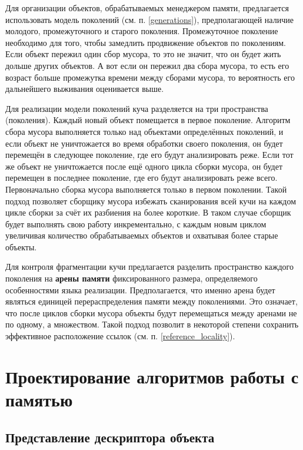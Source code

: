 Для организации объектов, обрабатываемых менеджером памяти, предлагается использовать модель поколений (см. п. \ref{generations}), предполагающей наличие молодого, промежуточного и старого поколения. Промежуточное поколение необходимо для того, чтобы замедлить продвижение объектов по поколениям. Если объект пережил один сбор мусора, то это не значит, что он будет жить дольше других объектов. А вот если он пережил два сбора мусора, то есть его возраст больше промежутка времени между сборами мусора, то вероятность его дальнейшего выживания оценивается выше.

Для реализации модели поколений куча разделяется на три пространства (поколения). Каждый новый объект помещается в первое поколение. Алгоритм сбора мусора выполняется только над объектами определённых поколений, и если объект не уничтожается во время обработки своего поколения, он будет перемещён в следующее поколение, где его будут анализировать реже. Если тот же объект не уничтожается после ещё одного цикла сборки мусора, он будет перемещен в последнее поколение, где его будут анализировать реже всего. Первоначально сборка мусора выполняется только в первом поколении. Такой подход позволяет сборщику мусора избежать сканирования всей кучи на каждом цикле сборки за счёт их разбиения на более короткие. В таком случае сборщик будет выполнять свою работу инкрементально, с каждым новым циклом увеличивая количество обрабатываемых объектов и охватывая более старые объекты.

Для контроля фрагментации кучи предлагается разделить пространство каждого поколения на \textbf{арены памяти} фиксированного размера, определяемого особенностями языка реализации. Предполагается, что именно арена будет являться единицей перераспределения памяти между поколениями. Это означает, что после циклов сборки мусора объекты будут перемещаться между аренами не по одному, а множеством. Такой подход позволит в некоторой степени сохранить эффективное расположение ссылок (см. п. \ref{reference_locality}).



\section{Проектирование алгоритмов работы с памятью}

\subsection{Представление дескриптора объекта}

